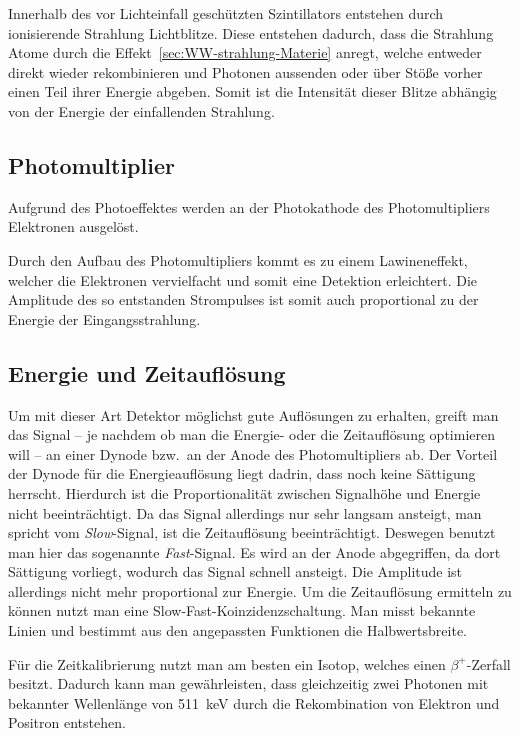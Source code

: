\documentclass[11pt, ngerman, fleqn, DIV=15, headinclude, BCOR=2cm]{scrreprt}
\begin{document}
Innerhalb des vor Lichteinfall geschützten Szintillators entstehen durch
ionisierende Strahlung Lichtblitze. 
Diese entstehen dadurch, dass die Strahlung Atome durch die
Effekt~\ref{sec:WW-strahlung-Materie} anregt, welche entweder direkt
wieder rekombinieren und Photonen aussenden oder über Stöße vorher einen Teil
ihrer Energie abgeben.
Somit ist die Intensität dieser Blitze abhängig von der Energie der einfallenden Strahlung.

\subsection{Photomultiplier}

Aufgrund des Photoeffektes werden an der Photokathode des Photomultipliers
Elektronen ausgelöst.

Durch den Aufbau des Photomultipliers kommt es zu einem Lawineneffekt,
welcher die Elektronen vervielfacht und somit eine Detektion erleichtert.
Die Amplitude des so entstanden Strompulses ist somit auch proportional zu der
Energie der Eingangsstrahlung.

\subsection{Energie und Zeitauflösung}

Um mit dieser Art Detektor möglichst gute Auflösungen zu erhalten, greift man
das Signal -- je nachdem ob man die Energie- oder die Zeitauflösung optimieren
will --
an einer Dynode bzw.\ an der Anode des Photomultipliers ab.
Der Vorteil der Dynode für die Energieauflösung liegt dadrin, dass noch keine
Sättigung herrscht. Hierdurch ist die Proportionalität zwischen Signalhöhe und
Energie nicht beeinträchtigt. Da das Signal allerdings nur sehr langsam
ansteigt, man spricht vom \emph{Slow}-Signal, ist die Zeitauflösung beeinträchtigt.
Deswegen benutzt man hier das sogenannte \emph{Fast}-Signal. Es wird an der Anode
abgegriffen, da dort Sättigung vorliegt, wodurch das Signal schnell ansteigt.
Die Amplitude ist allerdings nicht mehr proportional zur Energie.
Um die Zeitauflösung ermitteln zu können nutzt man eine
Slow-Fast-Koinzidenzschaltung. Man misst bekannte Linien und bestimmt aus den
angepassten Funktionen die Halbwertsbreite.

Für die Zeitkalibrierung nutzt man
am besten ein Isotop, welches einen $\beta^+$-Zerfall besitzt. Dadurch kann
man gewährleisten, dass gleichzeitig zwei Photonen mit bekannter Wellenlänge
von \SI{511}{\kilo\electronvolt} durch die Rekombination von Elektron und
Positron entstehen.
\end{document}
